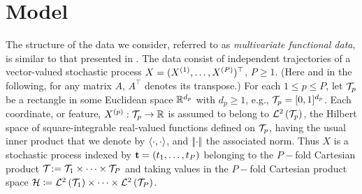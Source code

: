 \section{Model} %
\label{sec:model}

The structure of the data we consider, referred to as \emph{multivariate functional data}, is similar to that presented in \cite{happMultivariateFunctionalPrincipal2018a}. The data consist of independent trajectories of a vector-valued stochastic process $X = (X^{(1)}, \dots, X^{(P)})^\top$, $P\geq 1$. (Here and in the following, for any matrix $A$, $A^\top$ denotes its transpose.) For each $1 \leq p \leq P$, let $\mathcal{T}_{p}$ be a rectangle in some Euclidean space $\mathbb{R}^{d_p}$ with $d_p \geq 1$, e.g., $\mathcal{T}_{p} = [0,1]^{d_p}$. Each coordinate, or feature, $X^{(p)} : \mathcal{T}_{p} \rightarrow \mathbb{R}$ is assumed to belong to  $\mathcal{L}^{2}\left(\mathcal{T}_{p}\right)$, the Hilbert space of square-integrable real-valued functions defined on $\mathcal{T}_{p}$, having the usual inner product that we denote by $\left\langle\cdot, \cdot\right\rangle$, and $\left|\!\left|\cdot\right|\!\right|$ the associated norm. Thus $X$ is a stochastic process indexed by $\mathbf{t} = (t_1, \ldots, t_P)$ belonging to the $P-$fold Cartesian product $\mathcal{T}_{} : =\mathcal{T}_{1} \times \cdots \times \mathcal{T}_{P}$ and taking values in the $P-$fold Cartesian product space $\mathcal{H} \coloneqq \mathcal{L}^{2}\left(\mathcal{T}_{1}\right) \times \dots \times \mathcal{L}^{2}\left(\mathcal{T}_{P}\right)$. 

